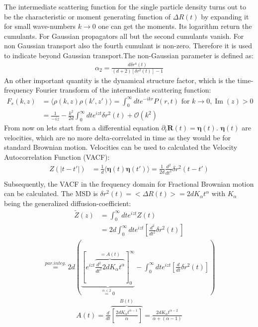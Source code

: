 \documentclass[
  a4paper,BCOR10mm,oneside,
  bibtotoc,idxtotoc,
  headsepline,footsepline,%
  fleqn,openbib
]{scrbook}
\begin{document}
The intermediate scattering function for the single particle density turns out to be the characteristic or moment generating function of $\Delta R(t)$ by expanding it for small wave-numbers $k \rightarrow 0$ one can get the moments. Its logarithm return the cumulants. For Gaussian propagators all but the second cumulants vanish. For non Gaussian transport also the fourth cumulant is non-zero. Therefore it is used to indicate beyond Gaussian transport.The non-Gaussian parameter is defined as:
\begin{align}
 \alpha_2=\frac{d \delta r^{4}(t)}{(d+2) [\delta r^{2}(t)]-1}
\end{align}
An other important quantity is the dynamical structure factor, which is the time-frequency Fourier transform of the intermediate scattering function:
\begin{align}
 F_{s}(k,z)&=\langle\rho(k,z) \rho(k',z')\rangle=\int_{0}^{\infty} d t e^{-i k r} P(r,t) \text{ for } k \rightarrow 0 , \operatorname{Im}(z) > 0 \\
 &= \frac{1}{-iz}-\frac{k^2}{2d}\int_{0}^{\infty} d t e^{izt} \delta r^2 (t) + \mathcal{O}(k^2)
\end{align}
From now on lets start from a differential equation $\partial_t \bm{R}(t)=\bm{\eta}(t)$. $\bm{\eta}(t)$ are velocities, which are no more delta-correlated in time as they would be for standard Brownian motion. Velocities can be used to calculated the Velocity Autocorrelation Function (VACF):
\begin{align}
Z(|t-t'|)&= \frac{1}{d}\langle \bm{\eta}(t) \bm{\eta}(t') \rangle = \frac{1}{2d} \frac{d^2}{dt^2} \delta r^2 (t-t')  \\
\end{align}
Subsequently, the VACF in the frequency domain for Fractional Brownian motion can be calculated. The MSD is $\delta r^{2}(t)= < \Delta R(t)>=2dK_{\alpha}t^{\alpha}$ with $K_{\alpha}$ being the generalized diffusion-coefficient:
\begin{align*}
 \tilde{Z}(z)&=\int_{0}^{\infty} d t e^{izt} Z(t) \\
 &=2 d \int_{0}^{\infty} d t e^{izt} \left[\frac{d^2}{dt^2}\delta r^2 (t) \right]
\end{align*}
\begin{align*}
  \stackrel{par. integ.}{=} 2d \left( \underbrace{\left [ e^{izt}\overbrace{ \frac{d^2}{dt^2} 2dK_{\alpha}t^{\alpha}}^{=A(t)} \right]_{0}^{\infty}}_{\stackrel{\alpha < 2} {=} 0}-\int_{0}^{\infty} d t e^{izt} \left[\frac{d}{dt}\delta r^2 (t)\right] \right) 
 \end{align*}
 \begin{align*}
 A(t)=\frac{d}{dt}\overbrace{ \left [\frac{2d K_{\alpha}t^{\alpha-1}}{\alpha} \right ]}^{B(t)}=\frac{2d K_{\alpha}t^{\alpha-2}}{\alpha+(\alpha-1)}
\end{align*}
\end{document}
